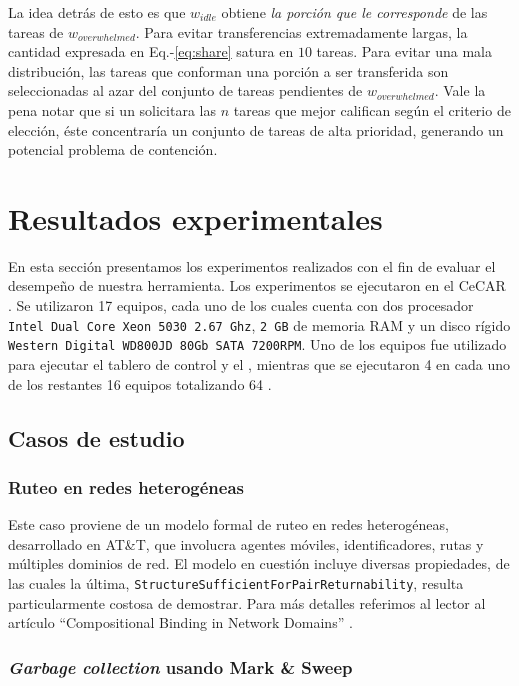 La idea detrás de esto es que $w_{idle}$
obtiene \emph{la porción que le corresponde} de las tareas de
$w_{overwhelmed}$. Para evitar transferencias extremadamente largas, la
cantidad expresada en Eq.-\ref{eq:share} satura en $10$ tareas. Para evitar
una mala distribución, las tareas que conforman una porción a ser transferida
son seleccionadas al azar del conjunto de tareas pendientes de
$w_{overwhelmed}$. Vale la pena notar que si un \w solicitara las $n$ tareas que mejor califican según el criterio de elección, éste concentraría un conjunto de tareas de alta prioridad, generando un potencial problema de contención.

\section{Resultados experimentales}

En esta sección presentamos los experimentos realizados con el fin de evaluar
el desempeño de nuestra herramienta.  Los experimentos se ejecutaron en el
\cluster CeCAR \cite{cecar??}. Se utilizaron 17 equipos,
cada uno de los cuales cuenta con dos procesador \texttt{Intel Dual Core Xeon
5030 2.67 Ghz}, \texttt{2 GB} de memoria RAM y un disco rígido \texttt{Western
Digital WD800JD 80Gb SATA 7200RPM}. Uno de los equipos fue utilizado para
ejecutar el tablero de control y el \master, mientras que se ejecutaron 4 \ws
en cada uno de los restantes 16 equipos totalizando 64 \ws.

\subsection{Casos de estudio}

\subsubsection{Ruteo en redes heterogéneas}

Este caso proviene de un modelo formal de ruteo en redes heterogéneas, desarrollado en AT\&T, que involucra agentes móviles, identificadores, rutas y múltiples dominios de red. El modelo en cuestión incluye diversas propiedades, de las cuales la última, \texttt{StructureSufficientForPairReturnability}, resulta particularmente costosa de demostrar. Para más detalles referimos al lector al artículo ``Compositional Binding in Network Domains'' \cite{paperPamela??}.

\subsubsection{\emph{Garbage collection} usando Mark \& Sweep}

